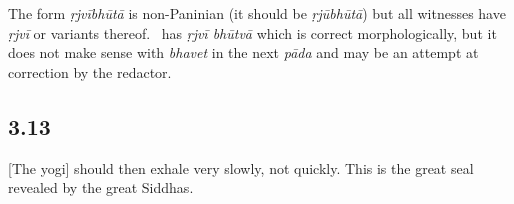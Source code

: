 \begin{ekdosis}
\begin{philcomm}[hp03_012]
The form \textit{ṛjvībhūtā} is non-Paninian (it should be \textit{ṛjūbhūtā}) but all witnesses have \textit{ṛjvī} or variants thereof. \alphaOne\ has \textit{ṛjvī bhūtvā} which is correct morphologically, but it does not make sense with \textit{bhavet} in the next \textit{pāda} and may be an attempt at correction by the redactor.


\end{philcomm}

\subsection*{3.13}
\begin{translation}[hp03_013]
{[}The yogi] should then exhale very slowly, not quickly. This is the great seal revealed by the great Siddhas.
\end{translation}



\end{ekdosis}
